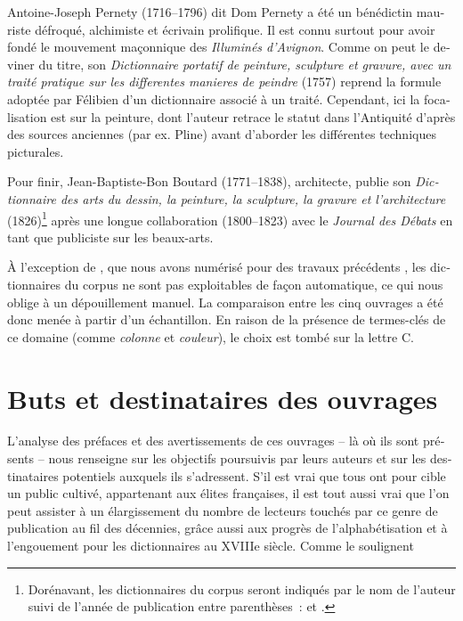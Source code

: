 \documentclass[output=paper,colorlinks,citecolor=brown,arabicfont,chinesefont,booklanguage=french]{langscibook}
\begin{document}
\begin{otherlanguage}{french}
Antoine-Joseph Pernety (1716--1796) dit Dom Pernety a été un bénédictin mauriste défroqué, alchimiste et écrivain prolifique. Il est connu surtout pour avoir fondé le mouvement maçonnique des \emph{Illuminés d’Avignon}. Comme on peut le deviner du titre, son \emph{Dictionnaire portatif de peinture, sculpture et gravure, avec un traité pratique sur les differentes manieres de peindre} (1757) reprend la formule adoptée par Félibien d’un dictionnaire associé à un traité. Cependant, ici la focalisation est sur la peinture, dont l’auteur retrace le statut dans l’Antiquité d’après des sources anciennes (par ex. Pline) avant d’aborder les différentes techniques picturales. 

Pour finir, Jean-Baptiste-Bon Boutard (1771--1838), architecte, publie son \emph{Dictionnaire des arts du dessin, la peinture, la sculpture, la gravure et l’architecture} (1826)\footnote{Dorénavant, les dictionnaires du corpus seront indiqués par le nom de l’auteur suivi de l’année de publication entre parenthèses~: \citet{Félibien1676,Marsy1746,Lacombe1752,Pernety1757} et \citet{Boutard1826}.} après une longue collaboration (1800--1823) avec le \emph{Journal des Débats} en tant que publiciste sur les beaux-arts.

À l’exception de \citet{Felibien1676}, que nous avons numérisé pour des travaux précédents \citep{Cetro2022}, les dictionnaires du corpus ne sont pas exploitables de façon automatique, ce qui nous oblige à un dépouillement manuel. La comparaison entre les cinq ouvrages a été donc menée à partir d’un échantillon. En raison de la présence de termes-clés de ce domaine (comme \emph{colonne} et \emph{couleur}), le choix est tombé sur la lettre C.

\section{Buts et destinataires des ouvrages}

L’analyse des préfaces et des avertissements de ces ouvrages – là où ils sont présents – nous renseigne sur les objectifs poursuivis par leurs auteurs et sur les destinataires potentiels auxquels ils s’adressent. S’il est vrai que tous ont pour cible un public cultivé, appartenant aux élites françaises, il est tout aussi vrai que l’on peut assister à un élargissement du nombre de lecteurs touchés par ce genre de publication au fil des décennies, grâce aussi aux progrès de l’alphabétisation et à l’engouement pour les dictionnaires au XVIIIe siècle. Comme le soulignent \citet [190]{MartinChartier1984} 


\end{otherlanguage}
\end{document}
